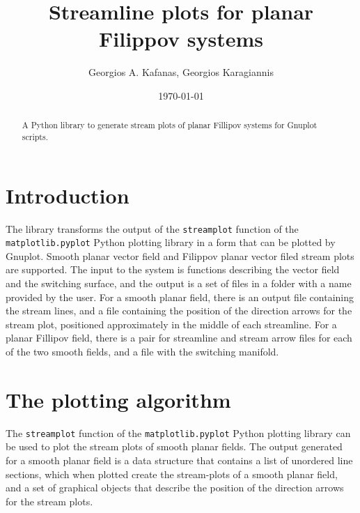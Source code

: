 \documentclass[english, a4paper]{article}
\begin{document}
\graphicspath{{Resources/Images/}{Resources/Diagrams/}}

\onehalfspacing
{}

\title{Streamline plots for planar Filippov systems}
\author{Georgios A. Kafanas, Georgios Karagiannis}
\date{\today}

\maketitle

\begin{abstract}
A Python library to generate stream plots of planar Fillipov systems for Gnuplot scripts.
\end{abstract}

\thispagestyle{empty}
\restoregeometry

\clearpage

\tableofcontents
\listoffigures
\listoftables
\listofalgorithms

\clearpage


\section{Introduction}

The library transforms the output of the \texttt{streamplot} function of the \texttt{matplotlib.pyplot} Python plotting library in a form that can be plotted by Gnuplot. Smooth planar vector field and Filippov planar vector filed stream plots are supported. The input to the system is functions describing the vector field and the switching surface, and the output is a set of files in a folder with a name provided by the user. For a smooth planar field, there is an output file containing the stream lines, and a file containing the position of the direction arrows for the stream plot, positioned approximately in the middle of each streamline. For a planar Fillipov field, there is a pair for streamline and stream arrow files for each of the two smooth fields, and a file with the switching manifold.

\section{The plotting algorithm}

The \texttt{streamplot} function of the \texttt{matplotlib.pyplot} Python plotting library can be used to plot the stream plots of smooth planar fields. The output generated for a smooth planar field is a data structure that contains a list of unordered line sections, which when plotted create the stream-plots of a smooth planar field, and a set of graphical objects that describe the position of the direction arrows for the stream plots.
\end{document}
